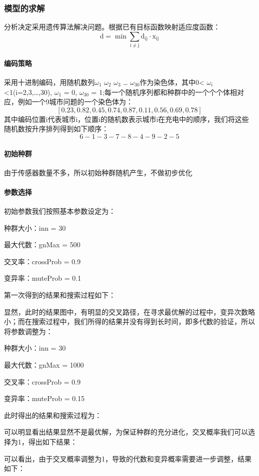 \documentclass{article}
\begin{document}
\subsubsection{模型的求解}
分析决定采用遗传算法解决问题。根据已有目标函数映射适应度函数：
$$\mathrm{d=\min \sum_{i \neq j} d_{i j} \cdot x_{i j}}$$

\paragraph{编码策略}
采用十进制编码，用随机数列$\omega_1$ $\omega_2$ $\omega_3$ … $\omega_{30}$作为染色体，其中0< $\omega_i$ <1(i=2,3,…,30), $\omega_1$ = 0, $\omega_{30}$ = 1;每一个随机序列都和种群中的一个个个体相对应，例如一个9城市问题的一个染色体为：
$$\left[0.23,0.82,0.45,0.74,0.87,0.11,0.56,0.69,0.78\right]$$
其中编码位置i代表城市i，位置i的随机数表示城市i在充电中的顺序，我们将这些随机数按升序排列得到如下顺序：
$$6-1-3-7-8-4-9-2-5$$

\paragraph{初始种群}
由于传感器数量不多，所以初始种群随机产生，不做初步优化

\paragraph{参数选择}
初始参数我们按照基本参数设定为：

种群大小：inn = 30

最大代数：gnMax = 500

交叉率：crossProb = 0.9

变异率：muteProb = 0.1

第一次得到的结果和搜索过程如下：


显然，此时的结果图中，有明显的交叉路径，在寻求最优解的过程中，变异次数略小；而在搜索过程中，我们所得的结果并没有得到长时间，即多代数的验证，所以将参数调整为：

种群大小：inn = 30

最大代数：gnMax = 1000

交叉率：crossProb = 0.9

变异率：muteProb = 0.15

此时得出的结果和搜索过程为：


可以明显看出结果显然不是最优解，为保证种群的充分进化，交叉概率我们可以选择为1，得出如下结果： 



可以看出，由于交叉概率调整为1，导致的代数和变异概率需要进一步调整，结果如下：
\end{document}
